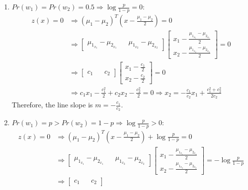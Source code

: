   \begin{enumerate}
    \item \(Pr(w_1)=Pr(w_2)=0.5\Rightarrow\log{\frac{p}{1-p}}=0\):
    \begin{align*}
        z(x)=0
        &\Rightarrow
        (\mu_1-\mu_2)^T(x-\frac{\mu_1-\mu_2}{2})=0\\
        &\Rightarrow
        \begin{bmatrix}
            \mu_{1_{x_1}}-\mu_{2_{x_1}} && \mu_{1_{x_2}}-\mu_{2_{x_2}}
        \end{bmatrix}
        \begin{bmatrix}
            x_1-\frac{\mu_{1_{x_1}}-\mu_{2_{x_1}}}{2} \\ x_2-\frac{\mu_{1_{x_2}}-\mu_{2_{x_2}}}{2}
        \end{bmatrix}
        =0\\
        &\Rightarrow
        \begin{bmatrix}
            c_1 && c_2
        \end{bmatrix}
        \begin{bmatrix}
            x_1-\frac{c_1}{2} \\ x_2-\frac{c_2}{2}
        \end{bmatrix}
        =0\\
        &\Rightarrow
        c_1x_1-\frac{c_1^2}{2}+c_2x_2-\frac{c_2^2}{2}=0
        \Rightarrow
        x_2 = -\frac{c_1}{c_2}x_1+\frac{c_1^2+c_2^2}{2c_2}
    \end{align*}
    Therefore, the line slope is \(m=-\frac{c_1}{c_2}\).
    \item \(Pr(w_1)=p>Pr(w_2)=1-p\Rightarrow\log{\frac{p}{1-p}}>0\):
    \begin{align*}
        z(x)=0
        &\Rightarrow
        (\mu_1-\mu_2)^T(x-\frac{\mu_1-\mu_2}{2})+\log{\frac{p}{1-p}}=0\\
        &\Rightarrow
        \begin{bmatrix}
            \mu_{1_{x_1}}-\mu_{2_{x_1}} && \mu_{1_{x_2}}-\mu_{2_{x_2}}
        \end{bmatrix}
        \begin{bmatrix}
            x_1-\frac{\mu_{1_{x_1}}-\mu_{2_{x_1}}}{2} \\ x_2-\frac{\mu_{1_{x_2}}-\mu_{2_{x_2}}}{2}
        \end{bmatrix}
        =-\log{\frac{p}{1-p}}\\
        &\Rightarrow
        \begin{bmatrix}
            c_1 && c_2
        \end{bmatrix}

\end{align*}
\end{enumerate}
